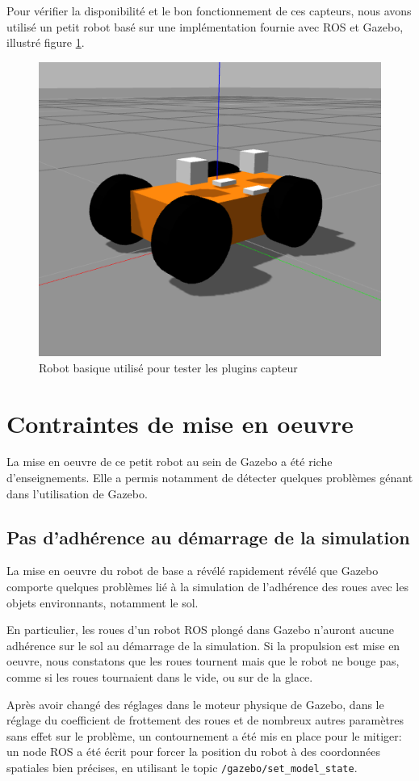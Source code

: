 \documentclass[12pt,a4paper]{report}
\begin{document}
		\para Pour vérifier la disponibilité et le bon fonctionnement de ces capteurs, nous avons utilisé un petit robot basé sur une implémentation fournie avec ROS et Gazebo, illustré figure \ref{fig:petitrobot}. 
		
		\begin{figure}[h!]
			\centering
			\includegraphics[width=0.4\linewidth]{img/image}
			\caption[petitrobot]{Robot basique utilisé pour tester les plugins capteur}
			\label{fig:petitrobot}
		\end{figure}
		
		

		
\section{Contraintes de mise en oeuvre}
	
	\para La mise en oeuvre de ce petit robot au sein de Gazebo a été riche d'enseignements. Elle a permis notamment de détecter quelques problèmes génant dans l'utilisation de Gazebo.
	
		\subsection{Pas d'adhérence au démarrage de la simulation}
		
		La mise en oeuvre du robot de base a révélé rapidement révélé que Gazebo comporte quelques problèmes  lié à la simulation de l'adhérence des roues avec les objets environnants, notamment le sol.
		
		\para En particulier, les roues d'un robot ROS plongé dans Gazebo n'auront aucune adhérence sur le sol au démarrage de la simulation. Si la propulsion est mise en oeuvre, nous constatons que les roues tournent mais que le robot ne bouge pas, comme si les roues tournaient dans le vide, ou sur de la glace.
		
		\para Après avoir changé des réglages dans le moteur physique de Gazebo, dans le réglage du coefficient de frottement des roues et de nombreux autres paramètres sans effet sur le problème, un contournement a été mis en place pour le mitiger: un node ROS a été écrit pour forcer la position du robot à des coordonnées spatiales bien précises, en utilisant le topic \verb|/gazebo/set_model_state|.
		
\end{document}
